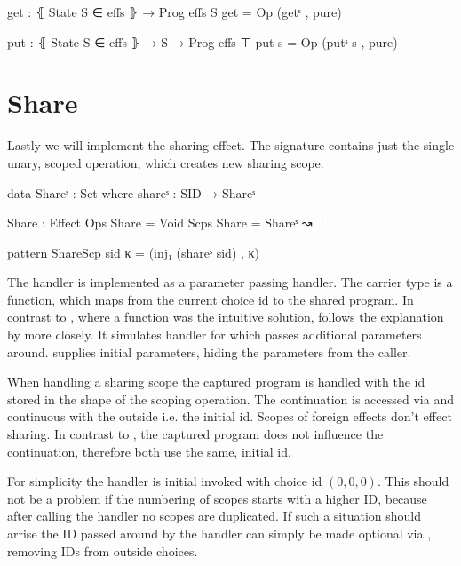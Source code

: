 \begin{code}
get : ⦃ State S ∈ effs ⦄ → Prog effs S
get = Op (getˢ , pure)

put : ⦃ State S ∈ effs ⦄ → S → Prog effs ⊤
put s = Op (putˢ s , pure)
\end{code}


\section{Share}

Lastly we will implement the sharing effect.
The signature contains just the single unary, scoped operation, 
which creates new sharing scope.

\begin{code}
data Shareˢ : Set where shareˢ : SID → Shareˢ

Share : Effect
Ops   Share = Void
Scps  Share = Shareˢ ↝ ⊤

pattern ShareScp sid κ = (inj₁ (shareˢ sid) , κ)
\end{code}
The handler is implemented as a parameter passing handler.
The carrier type is a function, which maps from the current choice id to the
shared program.
In contrast to , where a function was the intuitive solution,
 follows the explanation by
\textcite{DBLP:conf/esop/PlotkinP09} more closely.
It simulates handler for  which passes additional parameters
around.
 supplies initial parameters, hiding the parameters from
the caller.

When handling a sharing scope the captured program is handled with the id stored
in the shape of the scoping operation.
The continuation is accessed via \AgdaFunction{>>=} and continuous with the
outside i.e. the initial id.
Scopes of foreign effects don't effect sharing.
In contrast to , the captured program does not influence the
continuation, therefore both use the same, initial id.

For simplicity the handler is initial invoked with choice id $(0,0,0)$.
This should not be a problem if the numbering of scopes starts with a higher ID,
because after calling the  handler no scopes are duplicated.
If such a situation should arrise the ID passed around by the handler can simply
be made optional via , removing IDs from outside choices.

